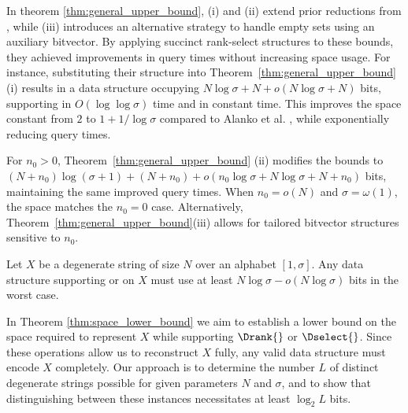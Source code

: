 \noindent In theorem \ref{thm:general_upper_bound}, (i) and (ii) extend prior reductions from \cite{alanko2023small}, while (iii) introduces an alternative strategy to handle empty sets using an auxiliary bitvector. By applying succinct rank-select structures to these bounds, they achieved improvements in query times without increasing space usage. For instance, substituting their structure into Theorem~\ref{thm:general_upper_bound} (i) results in a data structure occupying $N\log\sigma + N + o(N\log\sigma + N)$ bits, supporting \Drank{} in $O(\log\log\sigma)$ time and \Dselect{} in constant time. This improves the space constant from $2$ to $1 + 1/\log\sigma$ compared to Alanko et al. \cite{SubsetWT}, while exponentially reducing query times.

\noindent For $n_0 > 0$, Theorem~\ref{thm:general_upper_bound} (ii) modifies the bounds to $(N+n_0)\log(\sigma+1) + (N+n_0) + o(n_0\log\sigma + N\log\sigma + N + n_0)$ bits, maintaining the same improved query times. When $n_0 = o(N)$ and $\sigma = \omega(1)$, the space matches the $n_0=0$ case. Alternatively, Theorem~\ref{thm:general_upper_bound}(iii) allows for tailored bitvector structures sensitive to $n_0$.

\begin{theorem}
    \label{thm:space_lower_bound}
    Let $X$ be a degenerate string of size $N$ over an alphabet $[1,\sigma]$. Any data structure supporting \Drank{} or \Dselect{} on $X$ must use at least $N\log \sigma - o(N\log \sigma)$ bits in the worst case.
\end{theorem}

\noindent In Theorem \ref{thm:space_lower_bound} we aim to establish a lower bound on the space required to represent $X$ while supporting $\Drank{}$ or $\Dselect{}$. Since these operations allow us to reconstruct $X$ fully, any valid data structure must encode $X$ completely. Our approach is to determine the number $L$ of distinct degenerate strings possible for given parameters $N$ and $\sigma$, and to show that distinguishing between these instances necessitates at least $\log_2 L$ bits.

